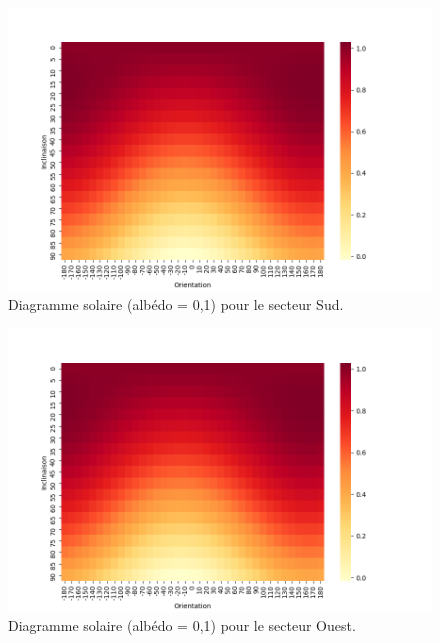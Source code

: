 \documentclass[12pt,a4paper,openright]{report}
\begin{document}
\begin{figure}[h!]
\begin{center}
\includegraphics[scale=0.6]{secteurSud}
\caption{Diagramme solaire (albédo = 0,1) pour le secteur Sud.}
\end{center}
\end{figure}

\begin{figure}[h!]
\begin{center}
\includegraphics[scale=0.6]{secteurOuest}
\caption{Diagramme solaire (albédo = 0,1) pour le secteur Ouest.}
\end{center}
\end{figure}
\end{document}
